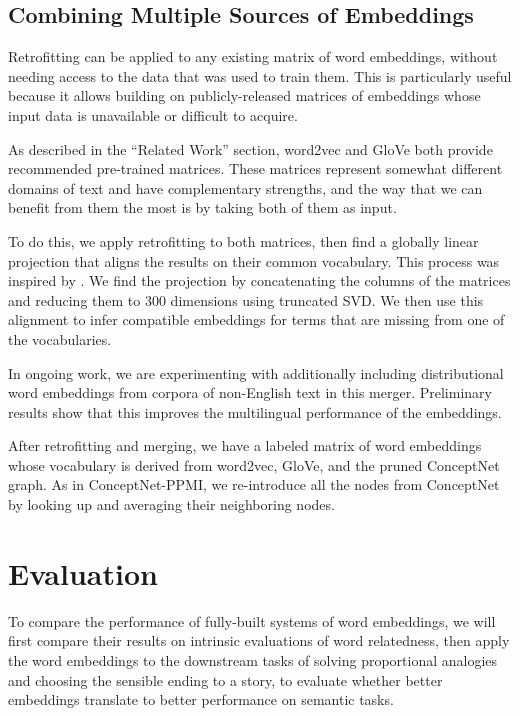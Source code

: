\documentclass[letterpaper]{article}
\begin{document}
\subsection{Combining Multiple Sources of Embeddings}

Retrofitting can be applied to any existing matrix of word embeddings, without
needing access to the data that was used to train them. This is particularly
useful because it allows building on publicly-released matrices of embeddings
whose input data is unavailable or difficult to acquire.

As described in the ``Related Work'' section, word2vec and GloVe both provide
recommended pre-trained matrices. These matrices represent somewhat different
domains of text and have complementary strengths, and the way that we can
benefit from them the most is by taking both of them as input.

To do this, we apply retrofitting to both matrices, then find a globally
linear projection that aligns the results on their common vocabulary.
This process was inspired by \citeauthor{zhao2015learning} .
We find the projection by concatenating the columns of the matrices and reducing
them to 300 dimensions using truncated SVD. We then use this alignment to infer
compatible embeddings for terms that are missing from one of the vocabularies.

In ongoing work, we are experimenting with additionally including
distributional word embeddings from corpora of non-English text in this merger.
Preliminary results show that this improves the multilingual performance of the
embeddings.

After retrofitting and merging, we have a labeled matrix of word embeddings
whose vocabulary is derived from word2vec, GloVe, and the pruned ConceptNet
graph. As in ConceptNet-PPMI, we re-introduce all the nodes from ConceptNet by
looking up and averaging their neighboring nodes.

\section{Evaluation}

To compare the performance of fully-built systems of word embeddings, we will
first compare their results on intrinsic evaluations of word relatedness, then
apply the word embeddings to the downstream tasks of solving proportional
analogies and choosing the sensible ending to a story, to evaluate whether
better embeddings translate to better performance on semantic tasks.
\end{document}
